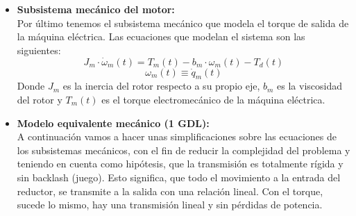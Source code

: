 \documentclass[10pt]{article}
\begin{document}
\begin{itemize}
	\item \textbf{Subsistema mecánico del motor:}\vspace{0.3cm}\\
	Por último tenemos el subsistema mecánico que modela el torque de salida de la máquina eléctrica. Las ecuaciones que modelan el sistema son las siguientes:
	\begin{equation}
		\label{eqn:sistMecanicoMotor}
		J_{m}\cdot \dot{\omega }_{m}\left ( t \right )=T_{m}\left ( t \right )-b_{m}\cdot \omega_{m}\left ( t \right )-T_{d}\left ( t \right )
	\end{equation}
	\begin{equation}
		\omega_{m}\left ( t \right )\equiv \dot{q}_{m}\left ( t \right )
	\end{equation}
	Donde $J_{m}$ es la inercia del rotor respecto a su propio eje, $b_{m}$ es la viscosidad del rotor y $T_{m}(t)$ es el torque electromecánico de la máquina eléctrica.

	\item \textbf{Modelo equivalente mecánico (1 GDL):}\vspace{0.3cm}\\
	A continuación vamos a hacer unas simplificaciones sobre las ecuaciones de los subsistemas mecánicos, con el fin de reducir la complejidad del problema y teniendo en cuenta como hipótesis, que la transmisión es totalmente rígida y sin backlash (juego).
    Esto significa, que todo el movimiento a la entrada del reductor, se transmite a la salida con una relación lineal. Con el torque, sucede lo mismo, hay una transmisión lineal y sin pérdidas de potencia.


\end{itemize}
\end{document}
